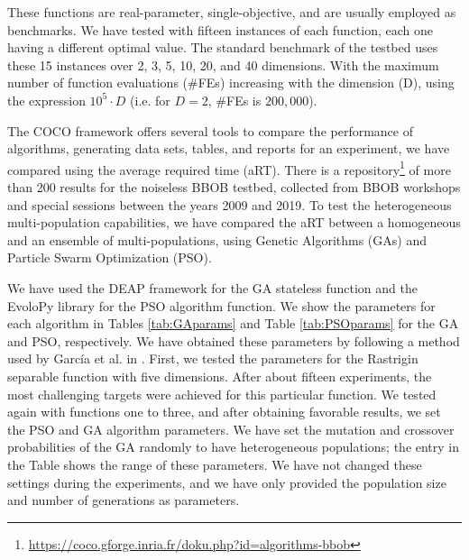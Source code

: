 \documentclass[runningheads]{llncs}
\begin{document}
These functions are real-parameter, single-objective, and are
usually employed as benchmarks. We have tested with fifteen instances of each
function, each one having a different optimal value. The standard benchmark of
the testbed %
uses these 15 instances over 2, 3, 5, 10, 20, and
40 dimensions. With the maximum number of function evaluations (\#FEs)
increasing with the dimension (D), using the expression $10^5 \cdot D$ (i.e.
for $D = 2$, \#FEs is $200,000$).

The COCO framework offers several tools to compare the performance of
algorithms, generating data sets, tables, and reports for an experiment, we have
compared using the average required time (aRT). There is a
repository\footnote{\url{https://coco.gforge.inria.fr/doku.php?id=algorithms-bbob}}
of more than 200 results for the noiseless BBOB testbed, collected from BBOB
workshops and special sessions between the years 2009 and 2019. To test the
heterogeneous multi-population capabilities, we have compared the aRT between a
homogeneous and an ensemble of multi-populations, using Genetic Algorithms
(GAs) and Particle Swarm Optimization (PSO).

We have used the DEAP framework for the
GA stateless function \cite{fortin2012deap} and the EvoloPy library
\cite{faris2016evolopy} for the PSO algorithm function. %
We show the parameters
for each algorithm in Tables \ref{tab:GAparams} and Table
\ref{tab:PSOparams} 
for the GA and PSO, respectively. We have obtained these parameters by following a
method used by García et al. in \cite{garcia2017benchmarking:anon}. First, we
tested the parameters for the Rastrigin separable function with five
dimensions. After about fifteen experiments, the most challenging targets were
achieved for this particular function. We tested again with functions one to
three, and after obtaining favorable results, we set the PSO and GA algorithm
parameters. We have set the mutation and crossover probabilities of the GA randomly
to have heterogeneous populations; %
the entry in the Table shows the range of these
parameters. We have not changed these settings during the experiments, and we have
only provided the population size and number of generations as parameters.
\end{document}
